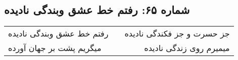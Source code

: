 \begin{center}
\section*{شماره ۶۵: رفتم خط عشق وبندگی نادیده}
\label{sec:065}
\begin{longtable}{l p{0.5cm} r}
رفتم خط عشق وبندگی نادیده
&&
جز حسرت و جز فکندگی نادیده
\\
میگریم پشت بر جهان آورده
&&
میمیرم روی زندگی نادیده
\\
\end{longtable}
\end{center}
